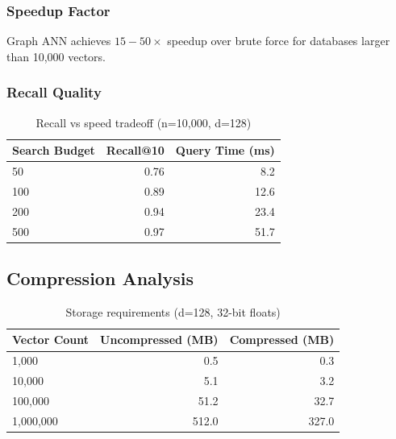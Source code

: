 \documentclass[12pt,a4paper]{article}
\begin{document}
\subsubsection{Speedup Factor}
Graph ANN achieves $15-50\times$ speedup over brute force for databases larger than 10,000 vectors.

\subsubsection{Recall Quality}
\begin{table}[h]
\centering
\begin{tabular}{@{}lrr@{}}
\toprule
\textbf{Search Budget} & \textbf{Recall@10} & \textbf{Query Time (ms)} \\ \midrule
50                     & 0.76               & 8.2                      \\
100                    & 0.89               & 12.6                     \\
200                    & 0.94               & 23.4                     \\
500                    & 0.97               & 51.7                     \\ \bottomrule
\end{tabular}
\caption{Recall vs speed tradeoff (n=10,000, d=128)}
\end{table}

\subsection{Compression Analysis}

\begin{table}[h]
\centering
\begin{tabular}{@{}lrr@{}}
\toprule
\textbf{Vector Count} & \textbf{Uncompressed (MB)} & \textbf{Compressed (MB)} \\ \midrule
1,000                 & 0.5                        & 0.3                      \\
10,000                & 5.1                        & 3.2                      \\
100,000               & 51.2                       & 32.7                     \\
1,000,000             & 512.0                      & 327.0                    \\ \bottomrule
\end{tabular}
\caption{Storage requirements (d=128, 32-bit floats)}
\end{table}
\end{document}
